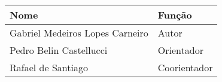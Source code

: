 \begin{table}[!h]
    \centering
    \begin{tabular}{|l|l|}
        \hline
        \textbf{Nome}                   & \textbf{Função}   \\
        \hline
        Gabriel Medeiros Lopes Carneiro & Autor             \\
        \hline
        Pedro Belin Castellucci         & Orientador        \\
        \hline
        Rafael de Santiago              & Coorientador      \\
        \hline
    \end{tabular}
    \label{tab:resources}
\end{table}